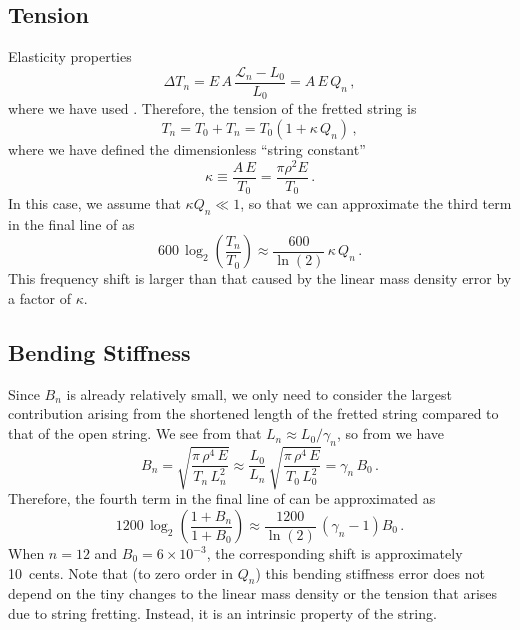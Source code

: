  \subsection{Tension\label{sct:model_tension}}
Elasticity properties~\cite{ref:landau1986toe}
 \begin{equation} \label{eqn:youngs_mod_def}
\Delta T_n = E\, A\, \frac{\mathcal{L}_n - L_0}{L_0} = A\, E\, Q_n\, ,
 \end{equation}
where we have used . Therefore, the tension of the fretted string is
 \begin{equation}
T_n = T_0 + T_n = T_0 \left( 1 + \kappa\, Q_n \right)\, ,
 \end{equation}
where we have defined the dimensionless ``string constant''
 \begin{equation}\label{eqn:kappa_def}
\kappa \equiv \frac{A\, E}{T_0} = \frac{\pi \rho^2 E}{T_0}\, .
 \end{equation}
In this case, we assume that $\kappa Q_n \ll 1$, so that we can approximate the third term in the final line of  as
 \begin{equation}
600\, \log_2 \left(  \frac{T_n}{T_0} \right) \approx \frac{600}{\ln(2)}\, \kappa\, Q_n\, .
 \end{equation}
This frequency shift is larger than that caused by the linear mass density error by a factor of $\kappa$.

 \subsection{Bending Stiffness}
Since $B_n$ is already relatively small, we only need to consider the largest contribution arising from the shortened length of the fretted string compared to that of the open string. We see from  that $L_n \approx L_0/\gamma_n$, so from  we have
 \begin{equation}
B_n = \sqrt{\frac{\pi\, \rho^4\, E}{T_n\, L_n^2}} \approx \frac{L_0}{L_n}\, \sqrt{\frac{\pi\, \rho^4\, E}{T_0\, L_0^2}} = \gamma_n\, B_0\, .
 \end{equation}
Therefore, the fourth term in the final line of  can be approximated as
 \begin{equation}
1200\, \log_2 \left( \frac{1 + B_n}{1 + B_0} \right) \approx \frac{1200}{\ln(2)}\, \left(\gamma_n - 1\right) B_0\, .
 \end{equation}
When $n = 12$ and $B_0 = 6 \times 10^{-3}$, the corresponding shift is approximately 10~cents. Note that (to zero order in $Q_n$) this bending stiffness error does not depend on the tiny changes to the linear mass density or the tension that arises due to string fretting. Instead, it is an intrinsic property of the string. 